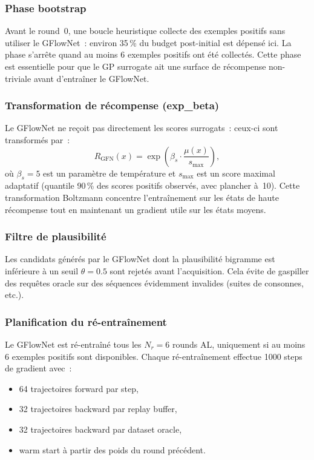 \documentclass[10pt]{article}
\begin{document}
\subsubsection{Phase bootstrap}

Avant le round~0, une boucle heuristique collecte des exemples positifs sans utiliser le GFlowNet~: environ 35\,\% du budget post-initial est dépensé ici. La phase s'arrête quand au moins 6 exemples positifs ont été collectés. Cette phase est essentielle pour que le GP surrogate ait une surface de récompense non-triviale avant d'entraîner le GFlowNet.

\subsubsection{Transformation de récompense (exp\_beta)}

Le GFlowNet ne reçoit pas directement les scores surrogats~: ceux-ci sont transformés par~:
\[
  R_{\text{GFN}}(x) = \exp\!\left(\beta_s \cdot \frac{\mu(x)}{s_{\max}}\right),
\]
où $\beta_s = 5$ est un paramètre de température et $s_{\max}$ est un score maximal adaptatif (quantile 90\,\% des scores positifs observés, avec plancher à~10). Cette transformation Boltzmann concentre l'entraînement sur les états de haute récompense tout en maintenant un gradient utile sur les états moyens.

\subsubsection{Filtre de plausibilité}

Les candidats générés par le GFlowNet dont la plausibilité bigramme est inférieure à un seuil $\theta = 0.5$ sont rejetés avant l'acquisition. Cela évite de gaspiller des requêtes oracle sur des séquences évidemment invalides (suites de consonnes, etc.).

\subsubsection{Planification du ré-entraînement}

Le GFlowNet est ré-entraîné tous les $N_r = 6$ rounds AL, uniquement si au moins 6 exemples positifs sont disponibles. Chaque ré-entraînement effectue 1000 steps de gradient avec~:
\begin{itemize}[noitemsep]
  \item 64 trajectoires forward par step,
  \item 32 trajectoires backward par replay buffer,
  \item 32 trajectoires backward par dataset oracle,
  \item warm start à partir des poids du round précédent.
\end{itemize}
\end{document}
